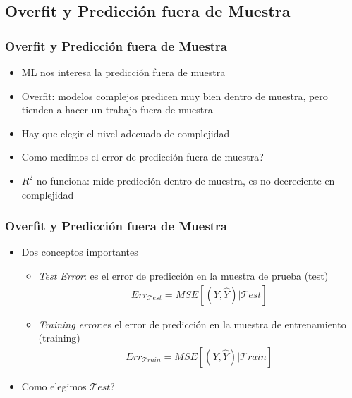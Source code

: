\documentclass[
  shownotes,
  xcolor={svgnames},
  hyperref={colorlinks,citecolor=DarkBlue,linkcolor=DarkRed,urlcolor=DarkBlue}
  , aspectratio=169]{beamer}
\begin{document}
\subsection{Overfit y Predicción fuera de Muestra}
\begin{frame}[fragile]
\frametitle{Overfit y Predicción fuera de Muestra}


\begin{itemize}
  \item ML nos interesa la predicción fuera de muestra
  \medskip
  \item Overfit: modelos complejos predicen muy bien dentro de muestra, pero tienden a hacer un trabajo fuera de muestra 
  \medskip
  \item Hay que elegir el nivel adecuado de complejidad 
  \medskip
  \item Como medimos el error de predicción fuera de muestra?
  \medskip
  \item $R^2$ no funciona: mide predicción dentro de muestra, es no decreciente en complejidad
\end{itemize}


\end{frame}
\begin{frame}[fragile]
\frametitle{Overfit y Predicción fuera de Muestra}


\begin{itemize}

\item Dos conceptos importantes
\medskip
\begin{itemize}
  \item {\it Test Error}: es el error de predicción en la muestra de prueba (test)
  \medskip
  \begin{align}
    Err_{\mathcal{T}est} =MSE[(Y,\hat Y)|\mathcal{T}est]
  \end{align}
  \medskip
  \item {\it Training error}:es el error de predicción en la muestra de entrenamiento (training)
  \medskip
  \begin{align}
    Err_{\mathcal{T}rain} = MSE[(Y,\hat Y)|\mathcal{T}rain]
  \end{align}
    \end{itemize}
    \medskip
  \item Como elegimos $\mathcal{T}est$?
  
\end{itemize}



\end{frame}
\end{document}
